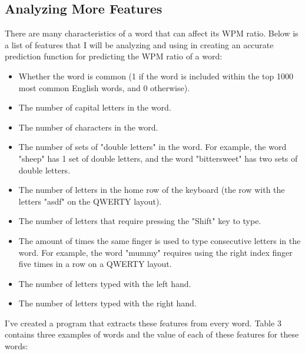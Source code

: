 \documentclass[12pt, demo]{article}
\begin{document}
\subsection*{Analyzing More Features}
There are many characteristics of a word that can affect its WPM ratio. Below is a list of features that I will be analyzing and using in creating an accurate prediction function for predicting the WPM ratio of a word:

\begin{itemize}
	\item Whether the word is common (1 if the word is included within the top 1000 most common English words, and 0 otherwise).
	\item The number of capital letters in the word.
	\item The number of characters in the word.
	\item The number of sets of "double letters" in the word. For example, the word "sheep" has 1 set of double letters, and the word "bittersweet" has two sets of double letters.
	\item The number of letters in the home row of the keyboard (the row with the letters "asdf" on the QWERTY layout).
	\item The number of letters that require pressing the "Shift" key to type.
	\item The amount of times the same finger is used to type consecutive letters in the word. For example, the word "mummy" requires using the right index finger five times in a row on a QWERTY layout.
	\item The number of letters typed with the left hand.
	\item The number of letters typed with the right hand.
\end{itemize}

I've created a program that extracts these features from every word. Table 3 contains three examples of words and the value of each of these features  for these words:
\end{document}
